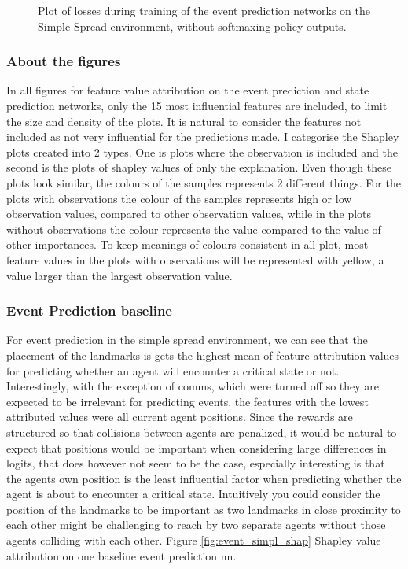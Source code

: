 \documentclass[UKenglish]{uiomasterthesis}
\begin{document}
\begin{figure}[H]
    \centering
    
	\label{fig:crit_losses}
    \caption{Plot of losses during training of the event prediction networks on the Simple Spread environment, without softmaxing policy outputs.}
\end{figure}

\subsubsection{About the figures}
In all figures for feature value attribution on the event prediction and state prediction networks, only the 15 most influential features are included, to limit the size and density of the plots. It is natural to consider the features not included as not very influential for the predictions made.
I categorise the Shapley plots created into 2 types. One is plots where the observation is included and the second is the plots of shapley values of only the explanation. Even though these plots look similar, the colours of the samples represents 2 different things. For the plots with observations the colour of the samples represents high or low observation values, compared to other observation values, while in the plots without observations the colour represents the value compared to the value of other importances. To keep meanings of colours consistent in all plot, most feature values in the plots with observations will be represented with yellow, a value larger than the largest observation value.

\subsubsection{Event Prediction baseline}
For event prediction in the simple spread environment, we can see that the placement of the landmarks is gets the highest mean of feature attribution values for predicting whether an agent will encounter a critical state or not. Interestingly, with the exception of comms, which were turned off so they are expected to be irrelevant for predicting events, the features with the lowest attributed values were all current agent positions. Since the rewards are structured so that collisions between agents are penalized, it would be natural to expect that positions would be important when considering large differences in logits, that does however not seem to be the case, especially interesting is that the agents own position is the least influential factor when predicting whether the agent is about to encounter a critical state. Intuitively you could consider the position of the landmarks to be important as two landmarks in close proximity to each other might be challenging to reach by two separate agents without those agents colliding with each other. Figure \ref{fig:event_simpl_shap} Shapley value attribution on one baseline event prediction \ac{nn}.
\end{document}
